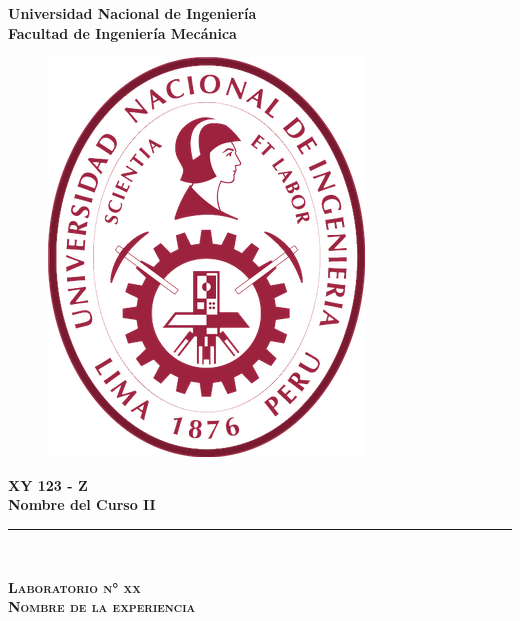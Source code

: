 \begin{titlepage}
	\begin{center}
		
		{\LARGE \textbf{Universidad Nacional de Ingeniería}}\\
		\vspace{10pt}
		{\large \textbf{Facultad de Ingeniería Mecánica}}\\
		\vspace{25pt}
				
		\begin{figure}[h]
			\centering
			\includegraphics[scale = .5]{caratula/uni-logo}		
		\end{figure}
		\vspace{25pt}
		
		{\Large \textbf{XY 123 - Z}}\\
		\vspace{10pt}		
		{\Large \textbf{Nombre del Curso II}}\\
		\vspace{15pt}		
		
		\rule{\linewidth}{1pt}\\
		\vspace{3mm}
		
		\begin{spacing}{1.5}
			\textsc{{\LARGE \textbf{Laboratorio n° xx}}\\
			{\large \textbf{Nombre de la experiencia}}}
		\end{spacing}
		

\end{center}
\end{titlepage}
